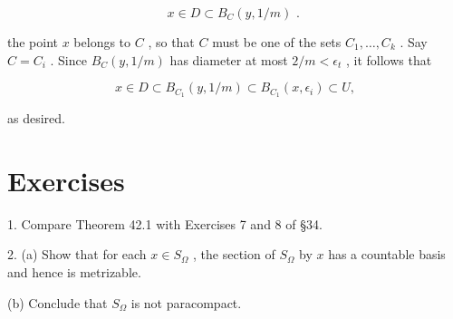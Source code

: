 \documentclass[10pt]{article}
\begin{document}
\[
x \in  D \subset  {B}_{C}\left( {y,1/m}\right) \text{ . }
\]

the point \(x\) belongs to \(C\) , so that \(C\) must be one of the sets \({C}_{1},\ldots ,{C}_{k}\) . Say \(C = {C}_{i}\) . Since \({B}_{C}\left( {y,1/m}\right)\) has diameter at most \(2/m < {\epsilon }_{t}\) , it follows that

\[
x \in  D \subset  {B}_{{C}_{1}}\left( {y,1/m}\right)  \subset  {B}_{{C}_{1}}\left( {x,{\epsilon }_{i}}\right)  \subset  U,
\]

as desired.

\section*{Exercises}

1. Compare Theorem 42.1 with Exercises 7 and 8 of §34.

2. (a) Show that for each \(x \in  {S}_{\Omega }\) , the section of \({S}_{\Omega }\) by \(x\) has a countable basis and hence is metrizable.

(b) Conclude that \({S}_{\Omega }\) is not paracompact.
\end{document}
